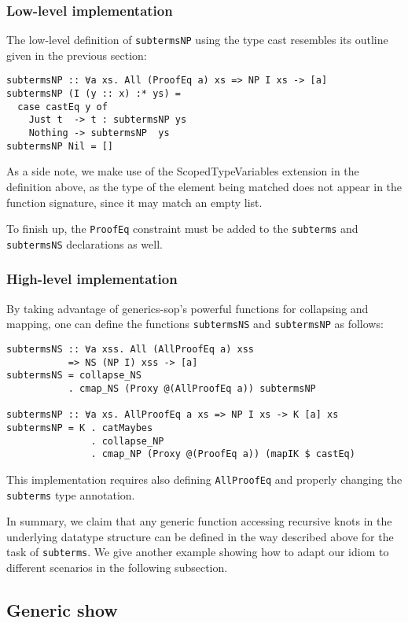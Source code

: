 \documentclass[runningheads]{llncs}
\newcommand{\K}[1]{\lstinline{#1}}
\begin{document}
\subsubsection{Low-level implementation}

The low-level definition of \K{subtermsNP} using the type cast resembles its outline given in the previous section:
\begin{lstlisting}
subtermsNP :: ∀a xs. All (ProofEq a) xs => NP I xs -> [a]
subtermsNP (I (y :: x) :* ys) =
  case castEq y of
    Just t  -> t : subtermsNP ys
    Nothing -> subtermsNP  ys
subtermsNP Nil = []
\end{lstlisting}

As a side note, we make use of the \textsf{ScopedTypeVariables} extension in the definition above, as the type of the element being matched does not appear in the function signature, since it may match an empty list. 

To finish up, the \K{ProofEq} constraint must be added to the \K{subterms} and \K{subtermsNS} declarations as well.

\subsubsection{High-level implementation}

By taking advantage of \textsf{generics-sop}'s powerful functions for collapsing and mapping, one can define the functions \K{subtermsNS} and \K{subtermsNP} as follows:
\begin{lstlisting}
subtermsNS :: ∀a xss. All (AllProofEq a) xss
           => NS (NP I) xss -> [a]
subtermsNS = collapse_NS
           . cmap_NS (Proxy @(AllProofEq a)) subtermsNP

subtermsNP :: ∀a xs. AllProofEq a xs => NP I xs -> K [a] xs
subtermsNP = K . catMaybes
               . collapse_NP
               . cmap_NP (Proxy @(ProofEq a)) (mapIK $ castEq)
\end{lstlisting}
This implementation requires also defining \K{AllProofEq} and properly changing the \K{subterms} type annotation.

In summary, we claim that any generic function accessing recursive knots in the underlying datatype structure can be defined in the way described above for the task of \K{subterms}. We give another example showing how to adapt our idiom to different scenarios in the following subsection.

\subsection{Generic show}
\label{subsec:gshow}
\end{document}
